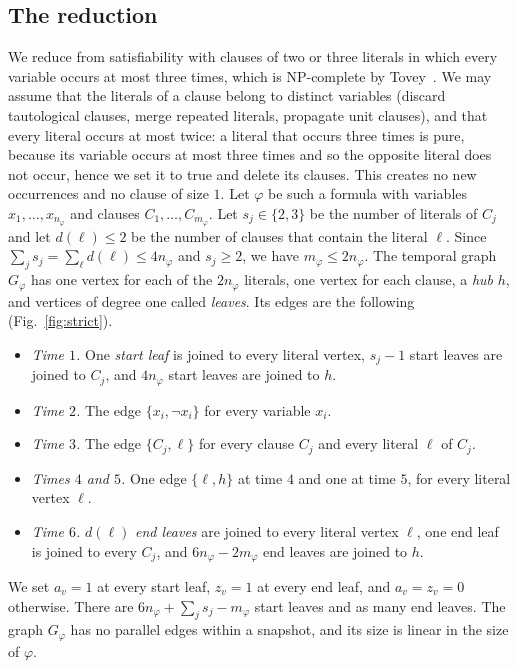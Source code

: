 \subsection{The reduction}

We reduce from satisfiability with clauses of two or three literals in which every variable occurs at most three times, which is NP-complete by Tovey~\cite{tovey1984}. We may assume that the literals of a clause belong to distinct variables (discard tautological clauses, merge repeated literals, propagate unit clauses), and that every literal occurs at most twice: a literal that occurs three times is pure, because its variable occurs at most three times and so the opposite literal does not occur, hence we set it to true and delete its clauses. This creates no new occurrences and no clause of size $1$. Let $\varphi$ be such a formula with variables $x_1,\dots,x_{n_\varphi}$ and clauses $C_1,\dots,C_{m_\varphi}$. Let $s_j\in\{2,3\}$ be the number of literals of $C_j$ and let $d(\ell)\le2$ be the number of clauses that contain the literal $\ell$. Since $\sum_js_j=\sum_\ell d(\ell)\le4n_\varphi$ and $s_j\ge2$, we have $m_\varphi\le2n_\varphi$. The temporal graph $G_\varphi$ has one vertex for each of the $2n_\varphi$ literals, one vertex for each clause, a \emph{hub} $h$, and vertices of degree one called \emph{leaves}. Its edges are the following (Fig.~\ref{fig:strict}).
\begin{itemize}
\item \emph{Time $1$.} One \emph{start leaf} is joined to every literal vertex, $s_j-1$ start leaves are joined to $C_j$, and $4n_\varphi$ start leaves are joined to $h$.
\item \emph{Time $2$.} The edge $\{x_i,\lnot x_i\}$ for every variable $x_i$.
\item \emph{Time $3$.} The edge $\{C_j,\ell\}$ for every clause $C_j$ and every literal $\ell$ of $C_j$.
\item \emph{Times $4$ and $5$.} One edge $\{\ell,h\}$ at time $4$ and one at time $5$, for every literal vertex $\ell$.
\item \emph{Time $6$.} $d(\ell)$ \emph{end leaves} are joined to every literal vertex $\ell$, one end leaf is joined to every $C_j$, and $6n_\varphi-2m_\varphi$ end leaves are joined to $h$.
\end{itemize}
We set $a_v=1$ at every start leaf, $z_v=1$ at every end leaf, and $a_v=z_v=0$ otherwise. There are $6n_\varphi+\sum_js_j-m_\varphi$ start leaves and as many end leaves. The graph $G_\varphi$ has no parallel edges within a snapshot, and its size is linear in the size of $\varphi$.

